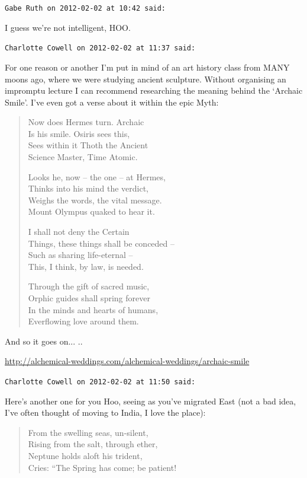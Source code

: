 \begin{footnotesize}
\begin{sffamily}
\hfill

\texttt{Gabe Ruth on 2012-02-02 at 10:42 said:}

I guess we're not intelligent, HOO.

\hfill

\texttt{Charlotte Cowell on 2012-02-02 at 11:37 said:}

For one reason or another I'm put in mind of an art history class from MANY moons ago, where we were studying ancient sculpture. Without organising an impromptu lecture I can recommend researching the meaning behind the `Archaic Smile'. I've even got a verse about it within the epic Myth:

\begin{verse}
Now does Hermes turn. Archaic\\
Is his smile. Osiris sees this,\\
Sees within it Thoth the Ancient\\
Science Master, Time Atomic.

Looks he, now -- the one -- at Hermes,\\
Thinks into his mind the verdict,\\
Weighs the words, the vital message.\\
Mount Olympus quaked to hear it.

I shall not deny the Certain\\
Things, these things shall be conceded --\\
Such as sharing life-eternal --\\
This, I think, by law, is needed.

Through the gift of sacred music,\\
Orphic guides shall spring forever\\
In the minds and hearts of humans,\\
Everflowing love around them.
\end{verse}

And so it goes on... ..

\url{http://alchemical-weddings.com/alchemical-weddings/archaic-smile}


\hfill

\texttt{Charlotte Cowell on 2012-02-02 at 11:50 said:}

Here's another one for you Hoo, seeing as you've migrated East (not a bad idea, I've often thought of moving to India, I love the place):

\begin{verse}
From the swelling seas, un-silent,\\
Rising from the salt, through ether,\\
Neptune holds aloft his trident,\\
Cries: ``The Spring has come; be patient!


\end{verse}
\end{sffamily}
\end{footnotesize}
